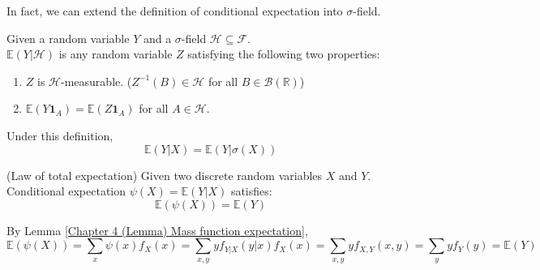 \documentclass{huhtakm-template-book}
\newcommand{\expect}{\mathbb{E}}
\begin{document}
\newpage
In fact, we can extend the definition of conditional expectation into $\sigma$-field.
\begin{defn}
	Given a random variable $Y$ and a $\sigma$-field $\mathcal{H}\subseteq\mathcal{F}$.\\
	$\expect(Y|\mathcal{H})$ is any random variable $Z$ satisfying the following two properties:
	\begin{enumerate}
		\item $Z$ is $\mathcal{H}$-measurable. ($Z^{-1}(B)\in\mathcal{H}$ for all $B\in\mathcal{B}(\mathbb{R})$)
		\item $\expect(Y\mathbf{1}_{A})=\expect(Z\mathbf{1}_{A})$ for all $A\in\mathcal{H}$.
	\end{enumerate}
\end{defn}
\begin{rem}
	Under this definition,
	\begin{equation*}
		\expect(Y|X)=\expect(Y|\sigma(X))
	\end{equation*}
\end{rem}
\begin{thm}(Law of total expectation)
	Given two discrete random variables $X$ and $Y$. Conditional expectation $\psi(X)=\expect(Y|X)$ satisfies:
	\begin{equation*}
		\expect(\psi(X))=\expect(Y)
	\end{equation*}
\end{thm}
\begin{proofing}
	By Lemma \ref{Chapter 4 (Lemma) Mass function expectation},
	\begin{equation*}
		\expect(\psi(X))=\sum_{x}\psi(x)f_{X}(x)=\sum_{x,y}yf_{Y|X}(y|x)f_{X}(x)=\sum_{x,y}yf_{X,Y}(x,y)=\sum_{y}yf_{Y}(y)=\expect(Y)
	\end{equation*}
\end{proofing}
\end{document}
